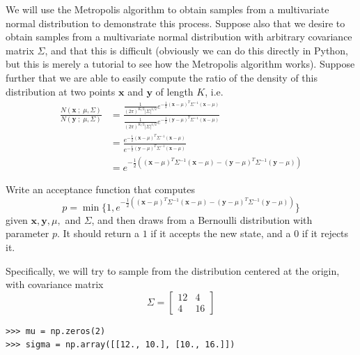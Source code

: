 We will use the Metropolis algorithm to obtain samples from a multivariate normal distribution to demonstrate this process.
Suppose also that we desire to obtain samples from a multivariate normal distribution with arbitrary covariance matrix $\Sigma$, and that this is difficult (obviously we can do this directly in Python, but this is merely a tutorial to see how the Metropolis algorithm works). Suppose further that we are able to easily compute the ratio of the density of this distribution at two points $\mathbf{x}$ and $\mathbf{y}$ of length $K$, i.e.
\begin{align*}
\frac{N(\mathbf{x} \; ; \; \mu, \Sigma)}{N(\mathbf{y} \; ; \; \mu, \Sigma)} & = \frac{\frac{1}{(2\pi)^{K/2}|\Sigma|^{1/2}} e^{-\frac{1}{2}(\mathbf{x} - \mu)^{T} \Sigma^{-1} (\mathbf{x} - \mu)}}{\frac{1}{(2\pi)^{K/2}|\Sigma|^{1/2}} e^{-\frac{1}{2}(\mathbf{y} - \mu)^{T} \Sigma^{-1} (\mathbf{x} - \mu)}} \\
& = \frac{e^{-\frac{1}{2}(\mathbf{x} - \mu)^{T} \Sigma^{-1} (\mathbf{x} - \mu)}}{e^{-\frac{1}{2}(\mathbf{y} - \mu)^{T} \Sigma^{-1} (\mathbf{x} - \mu)}} \\
& = e^{-\frac{1}{2}\left((\mathbf{x} - \mu)^{T} \Sigma^{-1} (\mathbf{x} - \mu) - (\mathbf{y} - \mu)^{T} \Sigma^{-1} (\mathbf{y} - \mu)\right)}
\end{align*}

\begin{problem} \label{problem1}
Write an acceptance function that computes
\begin{equation*}
p = \min \{1, e^{-\frac{1}{2}\left((\mathbf{x} - \mu)^{T} \Sigma^{-1} (\mathbf{x} - \mu) - (\mathbf{y} - \mu)^{T} \Sigma^{-1} (\mathbf{y} - \mu)\right)}\}
\end{equation*}
given $\mathbf{x}, \mathbf{y}, \mu,$ and $\Sigma$, and then draws from a Bernoulli distribution with parameter $p$. It should return a $1$ if it accepts the new state, and a $0$ if it rejects it.
\end{problem}

Specifically, we will try to sample from the distribution centered at the origin, with covariance matrix
\begin{equation*}
\Sigma = \left[ \begin{array}{cc} 12 & 4 \\ 4 & 16 \end{array} \right]
\end{equation*}

\begin{lstlisting}
>>> mu = np.zeros(2)
>>> sigma = np.array([[12., 10.], [10., 16.]])
\end{lstlisting}

